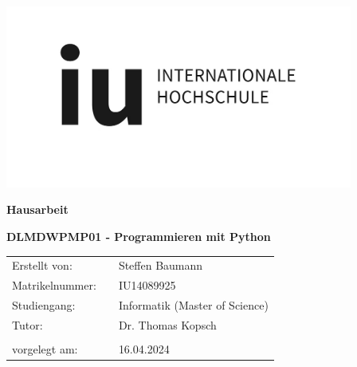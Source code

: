 \documentclass[
    a4paper, 								%
    oneside, 								%
    11pt, 									%
    listof=totoc, 					%
    bibliography=totoc, 		%
    final, 									%
    numbers=noenddot
]{scrreprt}
\begin{document}
\renewcommand{\figurename}{Abb.}
\renewcommand{\tablename}{Tab.}

\begin{titlepage}


\begin{center}
	
	\includegraphics[height=6cm]{LogoIU}
	
	\vspace{4cm}
	
	\LARGE{\textbf{Hausarbeit}}
	\vspace{2cm}
	
	\LARGE{\textbf{DLMDWPMP01 - Programmieren mit Python}}
\end{center}
\vspace{5cm}

\begin{flushleft}
\begin{tabular}{lcl}

Erstellt von: & & Steffen Baumann \\ 

Matrikelnummer: && IU14089925 \\ 

Studiengang: & & Informatik (Master of Science) \\ 

Tutor: & & Dr. Thomas Kopsch \\

\\



vorgelegt am: &  & 16.04.2024 \\ 

\end{tabular} 
\end{flushleft}
\end{titlepage}
\clearpage
{}
\tableofcontents
\clearpage
\newpage


\end{document}
